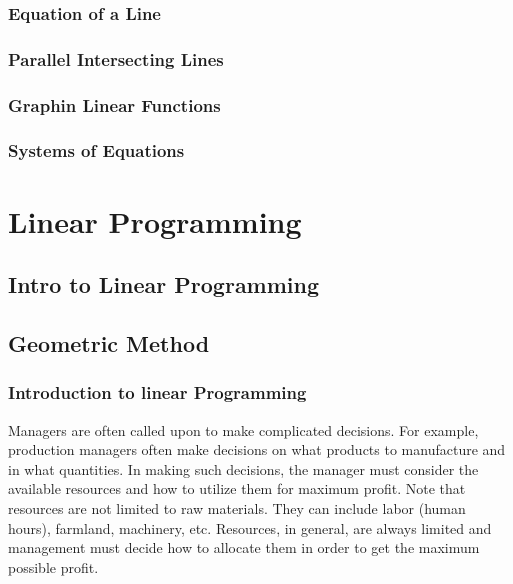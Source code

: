 \documentclass[
  letterpaper,
  DIV=11,
  numbers=noendperiod]{scrreprt}
\begin{document}
\hypertarget{equation-of-a-line}{%
\section{Equation of a Line}\label{equation-of-a-line}}

\hypertarget{parallel-intersecting-lines}{%
\section{Parallel Intersecting
Lines}\label{parallel-intersecting-lines}}

\hypertarget{graphin-linear-functions}{%
\section{Graphin Linear Functions}\label{graphin-linear-functions}}

\hypertarget{systems-of-equations}{%
\section{Systems of Equations}\label{systems-of-equations}}

\part{Linear Programming}

\hypertarget{intro-to-linear-programming}{%
\chapter{Intro to Linear
Programming}\label{intro-to-linear-programming}}

\hypertarget{geometric-method}{%
\chapter{Geometric Method}\label{geometric-method}}

\hypertarget{introduction-to-linear-programming}{%
\section{Introduction to linear
Programming}\label{introduction-to-linear-programming}}

Managers are often called upon to make complicated decisions. For
example, production managers often make decisions on what products to
manufacture and in what quantities. In making such decisions, the
manager must consider the available resources and how to utilize them
for maximum profit. Note that resources are not limited to raw
materials. They can include labor (human hours), farmland, machinery,
etc. Resources, in general, are always limited and management must
decide how to allocate them in order to get the maximum possible profit.
\end{document}
